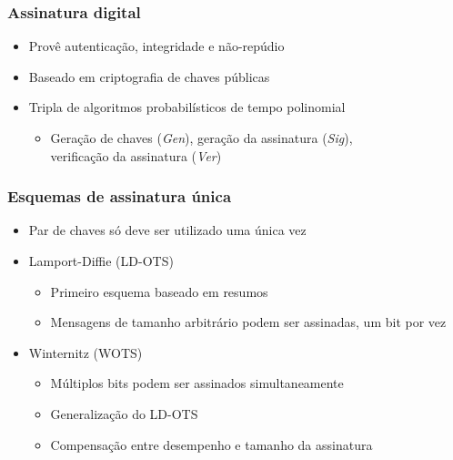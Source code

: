 \documentclass[12pt]{beamer}
\newcommand{\pk}{\mathcal{P}_k}
\newcommand{\sk}{\mathcal{S}_k}
\newcommand{\binwds}[1]{\{0, 1\}^{#1}}
\begin{document}
\begin{frame}
  \frametitle{Assinatura digital}
  \begin{itemize}
    \item Provê autenticação, integridade e não-repúdio
    \item Baseado em criptografia de chaves públicas
    \item Tripla de algoritmos probabilísticos de tempo polinomial
      \cite{Goldreich:2004:FCV:975541}
    \begin{itemize}
      \item Geração de chaves (\emph{Gen}), geração da assinatura (\emph{Sig}),\\
          verificação da assinatura (\emph{Ver})
    \end{itemize}
  \end{itemize}

    \begin{figure}[ht]
      \centering
    \end{figure}
\end{frame}

\begin{frame}
  \frametitle{Esquemas de assinatura única}
  \begin{itemize}
    \item Par de chaves só deve ser utilizado uma única vez
    \item Lamport-Diffie (LD-OTS)
    \begin{itemize}
      \item Primeiro esquema baseado em resumos
      \item Mensagens de tamanho arbitrário podem ser assinadas, um bit por vez
    \end{itemize}
    \item Winternitz (WOTS)
    \begin{itemize}
      \item Múltiplos bits podem ser assinados simultaneamente
      \item Generalização do LD-OTS
      \item Compensação entre desempenho e tamanho da assinatura
    \end{itemize}
  \end{itemize}
\end{frame}
\end{document}
